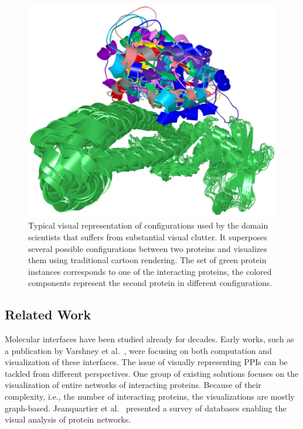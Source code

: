 \documentclass[twocolumn]{bmcart}%
\begin{document}
  \begin{figure}[h!]
  \centering
  \includegraphics[width=0.9\columnwidth]{images/figure1.png}
 \caption{Typical visual representation of configurations used by the domain scientists that suffers from substantial visual clutter. It superposes several possible configurations between two proteins and visualizes them using traditional cartoon rendering. The set of green protein instances corresponds to one of the interacting proteins, the colored components represent the second protein in different configurations.}
  \label{fig:problem}
\end{figure}

\subsection*{Related Work}
Molecular interfaces have been studied already for decades. 
Early works, such as a publication by Varshney et al.~\cite{Varshney2003}, were focusing on both computation and visualization of these interfaces.
The issue of visually representing PPIs can be tackled from different perspectives.
One group of existing solutions focuses on the visualization of entire networks of interacting proteins.
Because of their complexity, i.e., the number of interacting proteins, the visualizations are mostly graph-based.
Jeanquartier et al.~\cite{Jeanquartier2015} presented a survey of databases enabling the visual analysis of protein networks.
\end{document}
